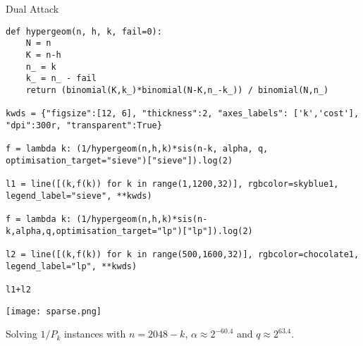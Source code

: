 \documentclass[presentation,smaller]{beamer}
\begin{document}
\begin{frame}[fragile,label={sec:org0d2ac16}]{Dual Attack}
 \lstset{language=sage,label= ,caption= ,captionpos=b,numbers=none}
\begin{lstlisting}
def hypergeom(n, h, k, fail=0):
    N = n
    K = n-h
    n_ = k
    k_ = n_ - fail
    return (binomial(K,k_)*binomial(N-K,n_-k_)) / binomial(N,n_)

kwds = {"figsize":[12, 6], "thickness":2, "axes_labels": ['k','cost'], "dpi":300r, "transparent":True}

f = lambda k: (1/hypergeom(n,h,k)*sis(n-k, alpha, q, optimisation_target="sieve")["sieve"]).log(2)

l1 = line([(k,f(k)) for k in range(1,1200,32)], rgbcolor=skyblue1, legend_label="sieve", **kwds)

f = lambda k: (1/hypergeom(n,h,k)*sis(n-k,alpha,q,optimisation_target="lp")["lp"]).log(2)

l2 = line([(k,f(k)) for k in range(500,1600,32)], rgbcolor=chocolate1, legend_label="lp", **kwds)

l1+l2
\end{lstlisting}

\begin{center}
\texttt{[image: sparse.png]}
\end{center}


\begin{center}
Solving \(1/P_k\) instances with \(n=2048-k\), \(α≈2^{-60.4}\) and \(q≈2^{63.4}\).
\end{center}
\end{frame}
\end{document}
